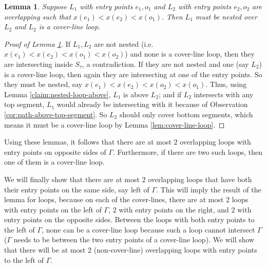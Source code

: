 \documentclass[pdflatex,sn-mathphys-num]{sn-jnl}
\theoremstyle{thmstyleone}
\newtheorem{lemma}{Lemma}
\begin{document}
\begin{lemma}\label{claim:loop-above-loop}
    Suppose $L_1$ with entry points $e_1,o_1$ and $L_2$ with  entry points $e_2,o_2$
    are overlapping such that $x(e_1)<x(e_2)<x(o_1)$. Then $L_1$ must be nested over $L_2$ and
    $L_2$ is a cover-line loop. 
\end{lemma}
\begin{proof}[Proof of Lemma \ref{claim:loop-above-loop}]
    If $L_1,L_2$ are not nested (i.e. $x(e_1)<x(e_2)<x(o_1)<x(o_2)$) and none is a cover-line loop, then they are intersecting inside $S_\tau$, a contradiction.
    If they are not nested and one (say $L_2$) is a cover-line loop, then again they are intersecting at one of the entry  points. So they must be nested, 
    say $x(e_1)<x(e_2)<x(o_2)<x(o_1)$. Thus, using Lemma \ref{claim:nested-loop-above}, $L_1$ is above $L_2$; and if $L_2$ intersects with any top segment, $L_1$ would already be intersecting with it because of Observation \ref{cor:path-above-top-segment}. So $L_2$ should only cover bottom segments, which means it
    must be a cover-line loop by Lemma \ref{lem:cover-line-loop}.
\end{proof}

	Using these lemmas, it follows that there are at most $2$ overlapping loops with entry points on opposite sides of $\Gamma$. Furthermore, if there are two such loops, then one of them is a cover-line loop.    
    
    We will finally show that there are at most $2$ overlapping loops that have both their entry points on the same side, say left of $\Gamma$. This will imply the result of the lemma for loops, because on each of the cover-lines, there are at most $2$ loops with entry points on the left of $\Gamma$, $2$ with entry points on the right, and $2$ with entry points on the opposite sides.
    Between the loops with both entry points to the left of $\Gamma$, none can be a cover-line loop because such a loop cannot intersect $\Gamma$ ($\Gamma$ needs to be between the two entry points of a cover-line loop). We will show that there will be at most $2$ (non-cover-line) overlapping loops with entry points to the left of $\Gamma$.
    
\end{document}
